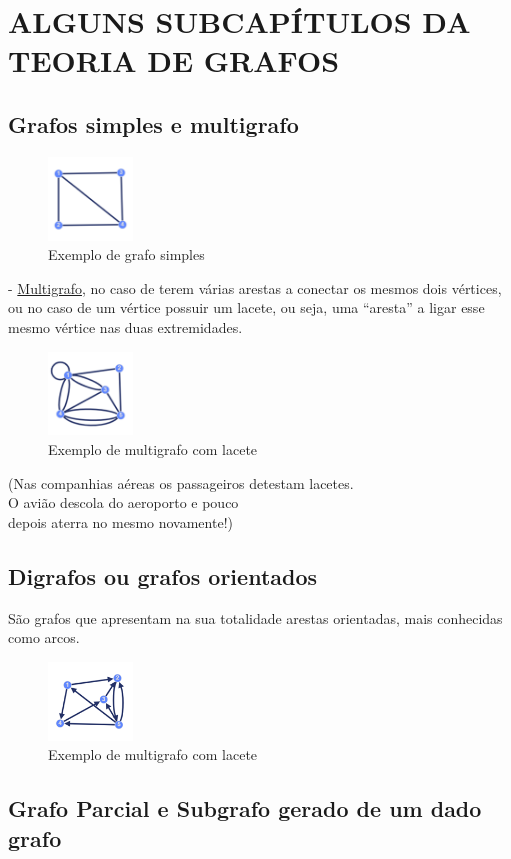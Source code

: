 \section{ALGUNS SUBCAPÍTULOS DA TEORIA DE GRAFOS}
\subsection{Grafos simples e multigrafo}
\begin{figure}[h]
    \centering
    \includegraphics[width=0.2\textwidth]{imgs/Figura3}
    \caption{Exemplo de grafo simples\label{fig:imagem3}}
\end{figure}
\linebreak
- \underline{Multigrafo}, no caso de terem várias arestas a conectar os mesmos dois vértices, ou no caso de um vértice possuir um lacete, ou seja, uma “aresta” a ligar esse mesmo vértice nas duas extremidades.
\begin{figure}[h]
    \centering
    \includegraphics[width=0.2\textwidth]{imgs/Figura4}
    \caption{Exemplo de multigrafo com lacete\label{fig:imagem4}}
\end{figure}
\linebreak
\flushright\scriptsize{(Nas companhias aéreas os passageiros detestam lacetes.\\O avião descola do aeroporto e pouco\\depois aterra no mesmo novamente!)}
\subsection{Digrafos ou grafos orientados}
São grafos que apresentam na sua totalidade arestas orientadas, mais conhecidas como arcos.
\linebreak
\begin{figure}[h]
    \centering
    \includegraphics[width=0.2\textwidth]{imgs/Figura5}
    \caption{Exemplo de multigrafo com lacete\label{fig:imagem5}}
\end{figure}

\subsection{Grafo Parcial e Subgrafo gerado de um dado grafo}
